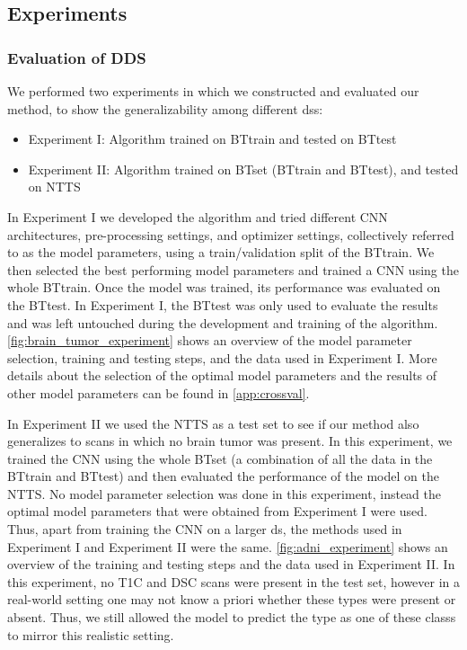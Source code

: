 \subsection{Experiments}\label{sec:experiments}

\subsubsection{Evaluation of \gls{DDS}}

We performed two experiments in which we constructed and evaluated our method, to show the generalizability among different \glspl{ds}:

\begin{itemize}
    \itemsep0em
    \item Experiment I\@: Algorithm trained on \gls{BTtrain} and tested on \gls{BTtest}
    \item Experiment II\@: Algorithm trained on \gls{BTset} (\gls{BTtrain} and \gls{BTtest}), and tested on \gls{NTTS}
\end{itemize}

In Experiment I we developed the algorithm and tried different \gls{CNN} architectures, pre-processing settings, and optimizer settings, collectively referred to as the model parameters, using a train/validation split of the \gls{BTtrain}.
We then selected the best performing model parameters and trained a \gls{CNN} using the whole \gls{BTtrain}.
Once the model was trained, its performance was evaluated on the \gls{BTtest}.
In Experiment I, the \gls{BTtest} was only used to evaluate the results and was left untouched during the development and training of the algorithm.
\cref{fig:brain_tumor_experiment} shows an overview of the model parameter selection, training and testing steps, and the data used in Experiment I.
More details about the selection of the optimal model parameters and the results of other model parameters can be found in \cref{app:crossval}.

In Experiment II we used the \gls{NTTS} as a test set to see if our method also generalizes to \glspl{scan} in which no brain \gls{tumor} was present.
In this experiment, we trained the \gls{CNN} using the whole \gls{BTset} (a combination of all the data in the \gls{BTtrain} and \gls{BTtest}) and then evaluated the performance of the model on the \gls{NTTS}.
No model parameter selection was done in this experiment, instead the optimal model parameters that were obtained from Experiment I were used.
Thus, apart from training the \gls{CNN} on a larger \gls{ds}, the methods used in Experiment I and Experiment II were the same.
\cref{fig:adni_experiment} shows an overview of the training and testing steps and the data used in Experiment II\@.
In this experiment, no \gls{T1C} and \gls{DSC} \glspl{scan} were present in the test set, however in a real-world setting one may not know a priori whether these \glspl{type} were present or absent.
Thus, we still allowed the model to predict the \gls{type} as one of these \glspl{class} to mirror this realistic setting.

